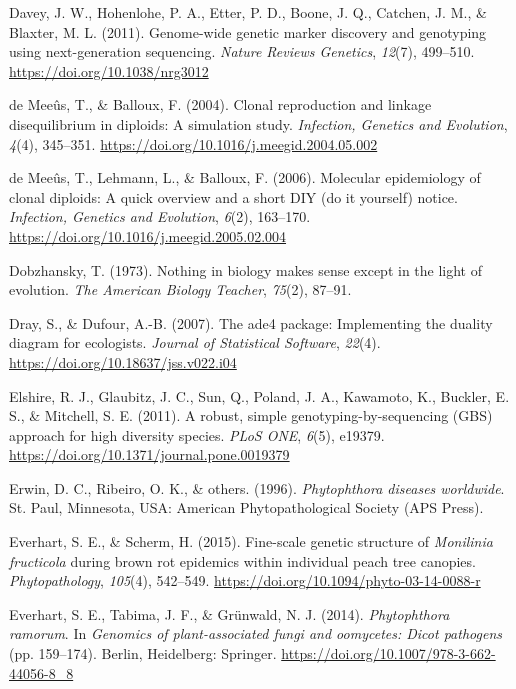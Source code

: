 \documentclass[double,11pt]{beavtex}
\begin{document}
  \hypertarget{ref-davey2011genome}{}
  Davey, J. W., Hohenlohe, P. A., Etter, P. D., Boone, J. Q., Catchen, J.
  M., \& Blaxter, M. L. (2011). Genome-wide genetic marker discovery and
  genotyping using next-generation sequencing. \emph{Nature Reviews
  Genetics}, \emph{12}(7), 499--510. \url{https://doi.org/10.1038/nrg3012}
  
  \hypertarget{ref-de2004clonal}{}
  de Meeûs, T., \& Balloux, F. (2004). Clonal reproduction and linkage
  disequilibrium in diploids: A simulation study. \emph{Infection,
  Genetics and Evolution}, \emph{4}(4), 345--351.
  \url{https://doi.org/10.1016/j.meegid.2004.05.002}
  
  \hypertarget{ref-de2006molecular}{}
  de Meeûs, T., Lehmann, L., \& Balloux, F. (2006). Molecular epidemiology
  of clonal diploids: A quick overview and a short DIY (do it yourself)
  notice. \emph{Infection, Genetics and Evolution}, \emph{6}(2), 163--170.
  \url{https://doi.org/10.1016/j.meegid.2005.02.004}
  
  \hypertarget{ref-dobzhansky2013nothing}{}
  Dobzhansky, T. (1973). Nothing in biology makes sense except in the
  light of evolution. \emph{The American Biology Teacher}, \emph{75}(2),
  87--91.
  
  \hypertarget{ref-dray2007ade4}{}
  Dray, S., \& Dufour, A.-B. (2007). The ade4 package: Implementing the
  duality diagram for ecologists. \emph{Journal of Statistical Software},
  \emph{22}(4). \url{https://doi.org/10.18637/jss.v022.i04}
  
  \hypertarget{ref-elshire2011robust}{}
  Elshire, R. J., Glaubitz, J. C., Sun, Q., Poland, J. A., Kawamoto, K.,
  Buckler, E. S., \& Mitchell, S. E. (2011). A robust, simple
  genotyping-by-sequencing (GBS) approach for high diversity species.
  \emph{PLoS ONE}, \emph{6}(5), e19379.
  \url{https://doi.org/10.1371/journal.pone.0019379}
  
  \hypertarget{ref-erwin1996phytophthora}{}
  Erwin, D. C., Ribeiro, O. K., \& others. (1996). \emph{Phytophthora
  diseases worldwide}. St. Paul, Minnesota, USA: American
  Phytopathological Society (APS Press).
  
  \hypertarget{ref-everhart2014fine}{}
  Everhart, S. E., \& Scherm, H. (2015). Fine-scale genetic structure of
  \emph{Monilinia fructicola} during brown rot epidemics within individual
  peach tree canopies. \emph{Phytopathology}, \emph{105}(4), 542--549.
  \url{https://doi.org/10.1094/phyto-03-14-0088-r}
  
  \hypertarget{ref-everhart2014phytophthora}{}
  Everhart, S. E., Tabima, J. F., \& Grünwald, N. J. (2014).
  \emph{Phytophthora ramorum}. In \emph{Genomics of plant-associated fungi
  and oomycetes: Dicot pathogens} (pp. 159--174). Berlin, Heidelberg:
  Springer. \url{https://doi.org/10.1007/978-3-662-44056-8_8}
  
\end{document}
